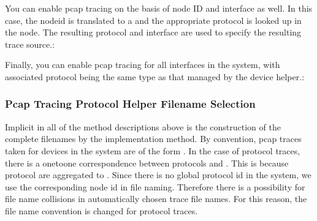 \documentclass[letterpaper,10pt,english]{sphinxmanual}
\renewcommand{\sphinxcode}[1]{\texttt{\small{#1}}}
\begin{document}
\begin{sphinxVerbatim}[commandchars=\\\{\}]
 
  
\end{sphinxVerbatim}

You can enable pcap tracing on the basis of node ID and interface as well. In
this case, the node\sphinxhyphen{}id is translated to a \sphinxcode{} and the appropriate
protocol is looked up in the node. The resulting protocol and interface are used
to specify the resulting trace source.:

\begin{sphinxVerbatim}[commandchars=\\\{\}]
   
\end{sphinxVerbatim}

Finally, you can enable pcap tracing for all interfaces in the system, with
associated protocol being the same type as that managed by the device helper.:

\begin{sphinxVerbatim}[commandchars=\\\{\}]
 
\end{sphinxVerbatim}


\subsubsection{Pcap Tracing Protocol Helper Filename Selection}
\label{\detokenize{tracing:pcap-tracing-protocol-helper-filename-selection}}
Implicit in all of the method descriptions above is the construction of the
complete filenames by the implementation method. By convention, pcap traces
taken for devices in the  system are of the form \sphinxcode{\sphinxupquote{\textless{}prefix\textgreater{}\sphinxhyphen{}\textless{}node
id\textgreater{}\sphinxhyphen{}\textless{}device id\textgreater{}.pcap}}. In the case of protocol traces, there is a one\sphinxhyphen{}to\sphinxhyphen{}one
correspondence between protocols and \sphinxcode{}. This is because protocol
\sphinxcode{} are aggregated to \sphinxcode{}. Since there is no global
protocol id in the system, we use the corresponding node id in file naming.
Therefore there is a possibility for file name collisions in automatically
chosen trace file names. For this reason, the file name convention is changed
for protocol traces.
\end{document}
